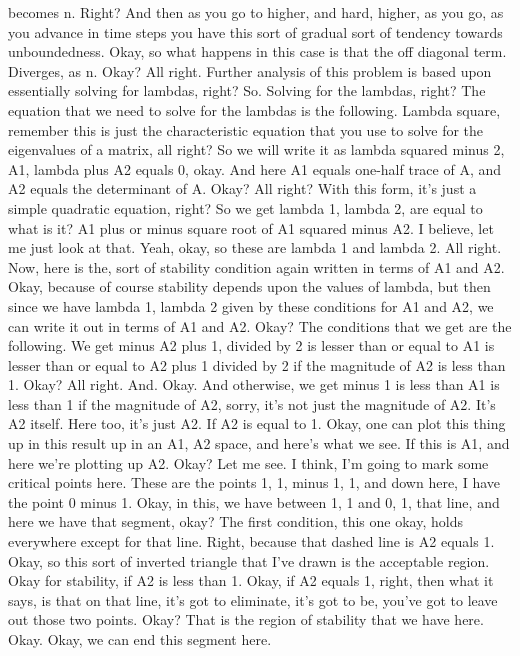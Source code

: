 \documentclass[10pt]{article}
\begin{document}
becomes n. Right? And then as you go to higher, and hard, higher, as you go, as you advance in time steps you have this sort of gradual sort of tendency towards unboundedness. Okay, so what happens in this case is that the off diagonal term. Diverges, as n. Okay? All right. Further analysis of this problem is based upon essentially solving for lambdas, right? So. Solving for the lambdas, right? The equation that we need to solve for the lambdas is the following. Lambda square, remember this is just the characteristic equation that you use to solve for the eigenvalues of a matrix, all right? So we will write it as lambda squared minus 2, A1, lambda plus A2 equals 0, okay. And here A1 equals one-half trace of A, and A2 equals the determinant of A. Okay? All right? With this form, it's just a simple quadratic equation, right? So we get lambda 1, lambda 2, are equal to what is it? A1 plus or minus square root of A1 squared minus A2. I believe, let me just look at that. Yeah, okay, so these are lambda 1 and lambda 2. All right. Now, here is the, sort of stability condition again written in terms of A1 and A2. Okay, because of course stability depends upon the values of lambda, but then since we have lambda 1, lambda 2 given by these conditions for A1 and A2, we can write it out in terms of A1 and A2. Okay? The conditions that we get are the following. We get minus A2 plus 1, divided by 2 is lesser than or equal to A1 is lesser than or equal to A2 plus 1 divided by 2 if the magnitude of A2 is less than 1. Okay? All right. And. Okay. And otherwise, we get minus 1 is less than A1 is less than 1 if the magnitude of A2, sorry, it's not just the magnitude of A2. It's A2 itself. Here too, it's just A2. If A2 is equal to 1. Okay, one can plot this thing up in this result up in an A1, A2 space, and here's what we see. If this is A1, and here we're plotting up A2. Okay? Let me see. I think, I'm going to mark some critical points here. These are the points 1, 1, minus 1, 1, and down here, I have the point 0 minus 1. Okay, in this, we have between 1, 1 and 0, 1, that line, and here we have that segment, okay? The first condition, this one okay, holds everywhere except for that line. Right, because that dashed line is A2 equals 1. Okay, so this sort of inverted triangle that I've drawn is the acceptable region. Okay for stability, if A2 is less than 1. Okay, if A2 equals 1, right, then what it says, is that on that line, it's got to eliminate, it's got to be, you've got to leave out those two points. Okay? That is the region of stability that we have here. Okay. Okay, we can end this segment here.
\end{document}
